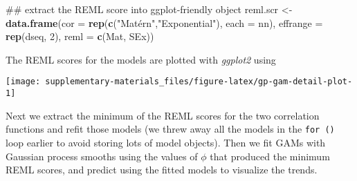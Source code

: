 \documentclass[12pt,]{article}
\newenvironment{Shaded}{\begin{snugshade}}{\end{snugshade}}
\newcommand{\KeywordTok}[1]{\textcolor[rgb]{0.13,0.29,0.53}{\textbf{{#1}}}}
\newcommand{\DataTypeTok}[1]{\textcolor[rgb]{0.13,0.29,0.53}{{#1}}}
\newcommand{\DecValTok}[1]{\textcolor[rgb]{0.00,0.00,0.81}{{#1}}}
\newcommand{\StringTok}[1]{\textcolor[rgb]{0.31,0.60,0.02}{{#1}}}
\newcommand{\NormalTok}[1]{{#1}}
\begin{document}
\begin{Shaded}
\begin{Highlighting}[]
\NormalTok{## extract the REML score into ggplot-friendly object}
\NormalTok{reml.scr <-}\StringTok{ }\KeywordTok{data.frame}\NormalTok{(}\DataTypeTok{cor =} \KeywordTok{rep}\NormalTok{(}\KeywordTok{c}\NormalTok{(}\StringTok{"Matérn"}\NormalTok{,}\StringTok{"Exponential"}\NormalTok{), }\DataTypeTok{each =} \NormalTok{nn),}
                       \DataTypeTok{effrange =} \KeywordTok{rep}\NormalTok{(dseq, }\DecValTok{2}\NormalTok{),}
                       \DataTypeTok{reml =} \KeywordTok{c}\NormalTok{(Mat, SEx))}
\end{Highlighting}
\end{Shaded}

The REML scores for the models are plotted with \emph{ggplot2} using

\begin{Shaded}
\end{Shaded}

\begin{center}\texttt{[image: supplementary-materials\_files/figure-latex/gp-gam-detail-plot-1]} \end{center}

Next we extract the minimum of the REML scores for the two correlation
functions and refit those models (we threw away all the models in the
\texttt{for\ ()} loop earlier to avoid storing lots of model objects).
Then we fit GAMs with Gaussian process smooths using the values of
\(\phi\) that produced the minimum REML scores, and predict using the
fitted models to visualize the trends.
\end{document}
